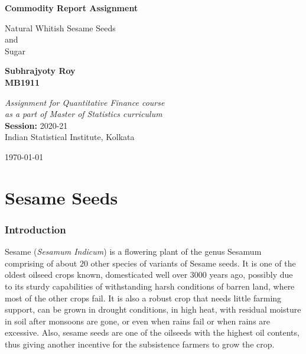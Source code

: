\documentclass[12pt]{report}
\begin{document}
\begin{titlepage}
    \begin{center}
        \vspace*{5cm}
 
        \Huge{\textbf{Commodity Report Assignment}}
 
        \vspace{0.5cm}
        \LARGE{Natural Whitish Sesame Seeds}\\
        \Large{and}\\
        \LARGE{Sugar}
             
        \vspace{1.5cm}
 
        \large{\textbf{Subhrajyoty Roy}}\\
        \large{\textbf{MB1911}}
 
        \vspace{2cm}
             
        \textit{Assignment for Quantitative Finance course\\
        as a part of Master of Statistics curriculum}\\
        \vspace{0.5cm}
        \textbf{Session: } 2020-21\\
        Indian Statistical Institute, Kolkata

        \vfill
        
        \begin{flushright}
            \normalsize{\today}            
        \end{flushright}
    \end{center}
\end{titlepage}

\tableofcontents
\pagebreak


\part{Sesame Seeds}
\setcounter{chapter}{1}

\section{Introduction}

Sesame (\textit{Sesamum Indicum}) is a flowering plant of the genus Sesamum comprising of about $20$ other species of variants of Sesame seeds. It is one of the oldest oilseed crops known, domesticated well over $3000$ years ago, possibly due to its sturdy capabilities of withstanding harsh conditions of barren land, where most of the other crops fail. It is also a robust crop that needs little farming support, can be grown in drought conditions, in high heat, with residual moisture in soil after monsoons are gone, or even when rains fail or when rains are excessive. Also, sesame seeds are one of the oilseeds with the highest oil contents, thus giving another incentive for the subsistence farmers to grow the crop. 
\end{document}
